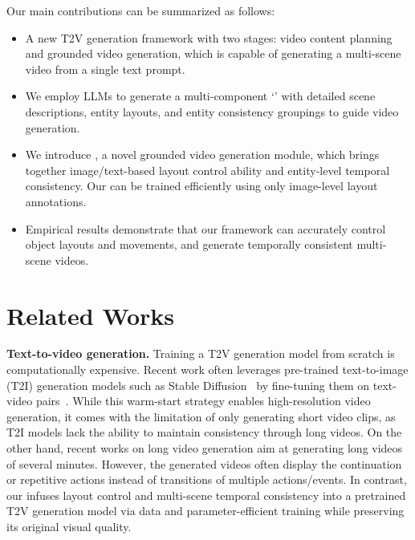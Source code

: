 \documentclass{article}
\begin{document}
Our main contributions can be summarized as follows:
\begin{itemize}[leftmargin=1em]
    \setlength{\itemsep}{0pt}
    \setlength{\parskip}{0pt}
    \setlength{\parsep}{0pt}
    \item A new T2V generation framework \method{} with two stages: video content planning and grounded video generation, which is capable of generating a multi-scene video from a single text prompt.
    \item We employ LLMs to generate a multi-component `\videoplan{}'
    with detailed scene descriptions, entity layouts, and entity consistency groupings 
    to guide video generation.
    \item We introduce \videomodule{}, a novel grounded video generation module, which brings together image/text-based layout control ability and entity-level temporal consistency. Our \videomodule{} can be trained efficiently using only image-level layout annotations.
    \item Empirical results demonstrate that our framework can accurately control object layouts and movements, and generate temporally consistent multi-scene videos.
\end{itemize}






\section{Related Works}
\label{sec:related_works}

\noindent\textbf{Text-to-video generation.}
Training a T2V generation model from scratch is computationally expensive.
Recent work often leverages pre-trained text-to-image (T2I) generation models such as Stable Diffusion~\citep{rombach2022high} by fine-tuning them on text-video pairs~\citep{wang2023modelscope, blattmann2023align}.
While this warm-start strategy enables high-resolution video generation, it comes with the limitation of only generating short video clips, as T2I models lack the ability to maintain consistency through long videos. 
On the other hand, recent works on long video generation \citep{blattmann2023align, yin2023nuwa, villegas2022phenaki, he2023animate} aim at generating long videos of several minutes.
However, the generated videos often display the continuation or repetitive actions 
instead of transitions of multiple actions/events. 
In contrast, our \videomodule{} infuses layout control and multi-scene temporal consistency into a pretrained T2V generation model via data and parameter-efficient training while preserving its original visual quality.
\end{document}
